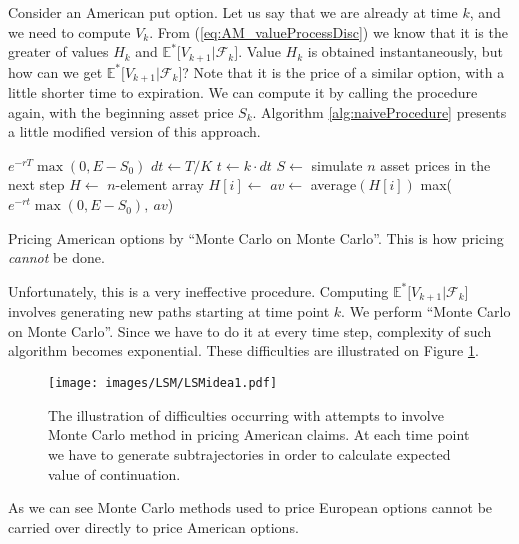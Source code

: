 \documentclass[a4paper,11pt, twoside]{book}
\theoremstyle{definition}
\theoremstyle{remark}
\def\Em{{\mathbb{E}^*}}
\begin{document}
Consider an American put option. Let us say that we are already at time $k$, and we need to compute $V_{k}$. From (\ref{eq:AM_valueProcessDisc}) we know that it is the greater of values $H_{k}$ and $\Em\bigl[ V_{k+1} | \mathcal{F}_{k} \bigr]$. Value $H_{k}$ is obtained instantaneously, but how can we get $\Em\bigl[ V_{k+1} | \mathcal{F}_{k} \bigr]$? Note that it is the price of a similar option, with a little shorter time to expiration. We can compute it by calling the procedure again, with the beginning asset price $S_{k}$. Algorithm \ref{alg:naiveProcedure} presents a little modified version of this approach.

\begin{algorithm}
 \begin{algorithmic}[1]
      \State \Return $e^{-rT} \max(0, E - S_0)$
    \EndIf
    \State $dt \gets T/K$
    \State $t \gets k\cdot dt$
    \State $S \gets$ simulate $n$ asset prices in the next step 
    \State $H \gets$ $n$-element array
       \State $H[i] \gets$ 
    \EndFor 
    \State $av \gets$ average$(H[i])$
    \State \Return max($e^{-rt} \max(0, E - S_0),\ av$)
  \EndFunction 
 \end{algorithmic}
 \caption{Pricing American options by ``Monte Carlo on Monte Carlo''. This is how pricing \emph{cannot} be done.}
 \label{alg:naiveProcedure}
\end{algorithm}

Unfortunately, this is a very ineffective procedure. Computing $\Em\bigl[ V_{k+1} | \mathcal{F}_{k} \bigr]$ involves generating new paths starting at time point $k$. We perform ``Monte Carlo on Monte Carlo''. Since we have to do it at every time step, complexity of such algorithm becomes exponential. These difficulties are illustrated on Figure \ref{fig:MC_difficulties}.

\begin{figure}[!ht]
\centering
 \texttt{[image: images/LSM/LSMidea1.pdf]}
\caption{The illustration of difficulties occurring with attempts to involve Monte Carlo method in pricing American claims. At each time point we have to generate subtrajectories in order to calculate expected value of continuation.}
\label{fig:MC_difficulties}
\end{figure}

As we can see Monte Carlo methods used to price European options cannot be carried over directly to price American options.
\end{document}
